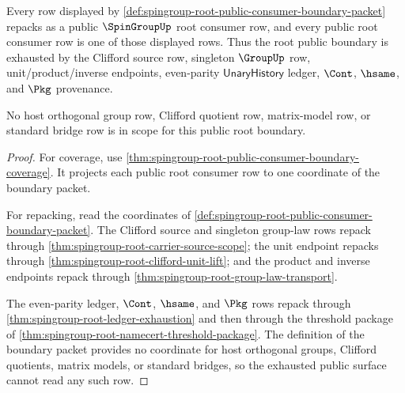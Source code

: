 \begin{theorem}
\label{thm:spingroup-root-public-consumer-boundary-exhaustion}
Every row displayed by
\autoref{def:spingroup-root-public-consumer-boundary-packet} repacks as a
public $\SpinGroupUp$ root consumer row, and every public root consumer row is
one of those displayed rows. Thus the root public boundary is exhausted by the
Clifford source row, singleton $\GroupUp$ row, unit/product/inverse endpoints,
even-parity $\mathsf{UnaryHistory}$ ledger, $\Cont$, $\hsame$, and $\Pkg$
provenance.

No host orthogonal group row, Clifford quotient row, matrix-model row, or
standard bridge row is in scope for this public root boundary.
\end{theorem}
\begin{proof}
For coverage, use
\autoref{thm:spingroup-root-public-consumer-boundary-coverage}. It projects
each public root consumer row to one coordinate of the boundary packet.

For repacking, read the coordinates of
\autoref{def:spingroup-root-public-consumer-boundary-packet}. The Clifford
source and singleton group-law rows repack through
\autoref{thm:spingroup-root-carrier-source-scope}; the unit endpoint repacks
through \autoref{thm:spingroup-root-clifford-unit-lift}; and the product and
inverse endpoints repack through
\autoref{thm:spingroup-root-group-law-transport}.

The even-parity ledger, $\Cont$, $\hsame$, and $\Pkg$ rows repack through
\autoref{thm:spingroup-root-ledger-exhaustion} and then through the threshold
package of \autoref{thm:spingroup-root-namecert-threshold-package}. The
definition of the boundary packet provides no coordinate for host orthogonal
groups, Clifford quotients, matrix models, or standard bridges, so the
exhausted public surface cannot read any such row.
\end{proof}

